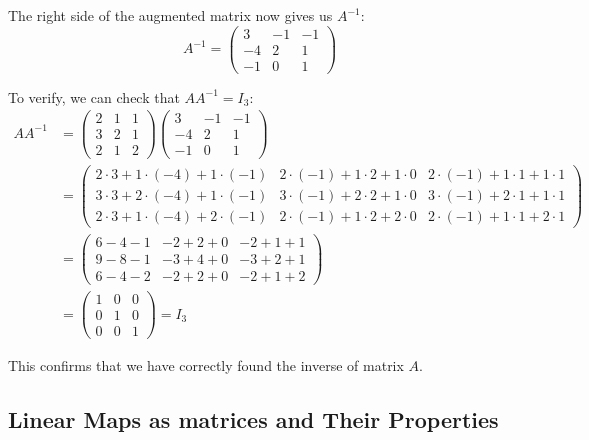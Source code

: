 The right side of the augmented matrix now gives us \(A^{-1}\):
\begin{equation*}
A^{-1} = 
\begin{pmatrix}
3 & -1 & -1 \\
-4 & 2 & 1 \\
-1 & 0 & 1
\end{pmatrix}
\end{equation*}

To verify, we can check that \(AA^{-1} = I_3\):
\begin{align*}
AA^{-1} &= 
\begin{pmatrix}
2 & 1 & 1 \\
3 & 2 & 1 \\
2 & 1 & 2
\end{pmatrix}
\begin{pmatrix}
3 & -1 & -1 \\
-4 & 2 & 1 \\
-1 & 0 & 1
\end{pmatrix} \\
&= 
\begin{pmatrix}
2 \cdot 3 + 1 \cdot (-4) + 1 \cdot (-1) & 2 \cdot (-1) + 1 \cdot 2 + 1 \cdot 0 & 2 \cdot (-1) + 1 \cdot 1 + 1 \cdot 1 \\
3 \cdot 3 + 2 \cdot (-4) + 1 \cdot (-1) & 3 \cdot (-1) + 2 \cdot 2 + 1 \cdot 0 & 3 \cdot (-1) + 2 \cdot 1 + 1 \cdot 1 \\
2 \cdot 3 + 1 \cdot (-4) + 2 \cdot (-1) & 2 \cdot (-1) + 1 \cdot 2 + 2 \cdot 0 & 2 \cdot (-1) + 1 \cdot 1 + 2 \cdot 1
\end{pmatrix} \\
&= 
\begin{pmatrix}
6 - 4 - 1 & -2 + 2 + 0 & -2 + 1 + 1 \\
9 - 8 - 1 & -3 + 4 + 0 & -3 + 2 + 1 \\
6 - 4 - 2 & -2 + 2 + 0 & -2 + 1 + 2
\end{pmatrix} \\
&= 
\begin{pmatrix}
1 & 0 & 0 \\
0 & 1 & 0 \\
0 & 0 & 1
\end{pmatrix} = I_3
\end{align*}

This confirms that we have correctly found the inverse of matrix \(A\).

\subsection{Linear Maps as matrices and Their Properties}

